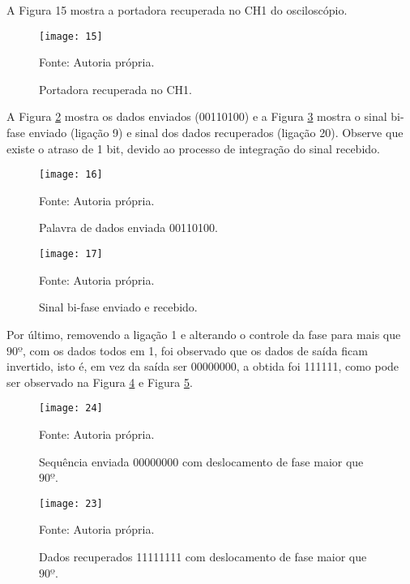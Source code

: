 	A Figura 15 mostra a portadora recuperada no CH1 do osciloscópio.
	
	\begin{figure}[H]
		\centering
		\caption{Portadora recuperada no CH1.}
		\texttt{[image: 15]}
		
		\small Fonte: Autoria própria.
		\label{fig:15}
	\end{figure}
	
	A Figura \ref{fig:16} mostra os dados enviados (00110100) e a Figura \ref{fig:17} mostra o sinal bi-fase enviado (ligação 9) e sinal dos dados recuperados (ligação 20). Observe que existe o atraso de 1 bit, devido ao processo de integração do sinal recebido.
	
	\begin{figure}[H]
		\centering
		\caption{Palavra de dados enviada 00110100.}
		\texttt{[image: 16]}
		
		\small Fonte: Autoria própria.
		\label{fig:16}
	\end{figure}
	
	\begin{figure}[H]
		\centering
		\caption{Sinal bi-fase enviado e recebido.}
		\texttt{[image: 17]}
		
		\small Fonte: Autoria própria.
		\label{fig:17}
	\end{figure}
	
	Por último, removendo a ligação 1 e alterando o controle da fase para mais que $90º$, com os dados todos em 1, foi observado que os dados de saída ficam invertido, isto é, em vez da saída ser 00000000, a obtida foi 111111, como pode ser observado na Figura \ref{fig:24} e Figura \ref{fig:23}.
	
	\begin{figure}[H]
		\centering
		\caption{Sequência enviada 00000000 com deslocamento de fase maior que $90º$.}
		\texttt{[image: 24]}
		
		\small Fonte: Autoria própria.
		\label{fig:24}
	\end{figure}
	
	\begin{figure}[H]
		\centering
		\caption{Dados recuperados 11111111 com deslocamento de fase maior que $90º$.}
		\texttt{[image: 23]}
		
		\small Fonte: Autoria própria.
		\label{fig:23}
	\end{figure}